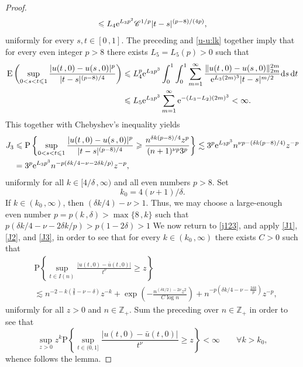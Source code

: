 \documentclass[reqno]{amsart}
\newcommand{\<}{\langle}
\renewcommand{\>}{\rangle}
\newcommand{\Z}{\mathbb{Z}}
\renewcommand{\P}{\mathrm{P}}
\newcommand{\E}{\mathrm{E}}
\newcommand{\1}{\mathbb{1}}
\renewcommand{\d}{{\rm d}}
\newcommand{\e}{{\rm e}}
\renewcommand{\ge}{\geqslant}
\renewcommand{\le}{\leqslant}
\theoremstyle{definition}
\numberwithin{equation}{section}
\begin{document}
\begin{proof}
\begin{align*}
		\le L_4 \e^{L_3 p^2} \mathscr{C}^{1/p} |t-s|^{(p-8)/(4p)},
	\end{align*}
	uniformly for every $s,t\in[0\,,1]$.
	The preceding and \eqref{u-u:lk} together
	imply that for every even integer $p>8$ there exists $L_5 = L_5(p)>0$ such that
	\begin{align*}
		\E\left( \sup_{0<s< t \le 1} \frac{|u(t\,,0)-u(s\,,0)|^p}{|t-s|^{(p-8)/4}} \right)
			&\le L_4^p \e^{L_3 p^3}  \int_0^1 \int_0^1
			\sum_{m=1}^\infty \frac{\|u(t\,,0)-u(s\,,0)
			\|_{2m}^{2m}}{\e^{L_3(2m)^3}|t-s|^{m/2}} \d s \, \d t\\
		&\le L_5 \e^{L_3 p^3} \sum_{m=1}^\infty \e^{-(L_3-L_2) (2m)^3} < \infty.
	\end{align*}
	This together with Chebyshev's inequality yields
	\begin{equation}\label{J3}\begin{split}
		J_3 &\le \P\left\{ \sup_{0<s < t \le 1}
			\frac{|u(t\,,0)-u(s\,,0)|^p}{|t-s|^{(p-8)/4}} 
			\ge \frac{n^{\delta k(p-8)/4}  z^p}{(n+1)^{\nu p}3^p } \right\}
			\lesssim 3^p \e^{L_3 p^3} n^{\nu p-(\delta k (p-8)/4)} z^{-p}\\ 
		&= 3^p \e^{L_3 p^3} n^{-p(\delta k/4 - \nu - 2\delta k/p)} z^{-p},
	\end{split}\end{equation}
	uniformly for all $k \in [4/\delta\,,\infty)$ and all even numbers $p > 8$.
	Set 
	\[
		k_0 = 4(\nu+1)/\delta.
	\]
	If $k \in (k_0\,,\infty)$, then $(\delta k/4) - \nu > 1$.
	Thus, we may choose a large-enough even number $p = p(k\,,\delta) > \max\{ 8\,, k\}$ such that
	$p(\delta k/4 - \nu - 2\delta k/p) > p(1 - 2\delta)>1$
	We now return to \eqref{j123}, and apply \eqref{J1}, \eqref{J2},
	and \eqref{J3}, in order to see that for every $k\in(k_0\,,\infty)$ there exists
	$C>0$ such that
	\begin{align*}
		&\P\left\{ \sup_{t\in I(n)} \frac{|u(t\,,0)-\bar{u}(t\,,0)|}{t^\nu} \ge z \right\}\\
		&\lesssim  n^{-2-k(\frac38-\nu-\delta)} z^{-k}
		+  \exp\left( - \frac{n^{(\delta k/2) - 2\nu} z^2}{C \log n} \right)
		+ n^{-p(\delta k/4 - \nu - \frac{2\delta k}{p})} z^{-p},
	\end{align*}
	uniformly for all $z>0$ and $n \in \Z_+$.
	Sum the preceding over $n \in \Z_+$ in order to see that
	\[
		\sup_{z>0} z^k \P\left\{ \sup_{t \in (0,1]} 
		\frac{|u(t\,,0)-\bar{u}(t\,,0)|}{t^\nu} \ge z \right\} < \infty \qquad \forall k > k_0,
	\]
	whence follows the lemma.
\end{proof}
\end{document}
